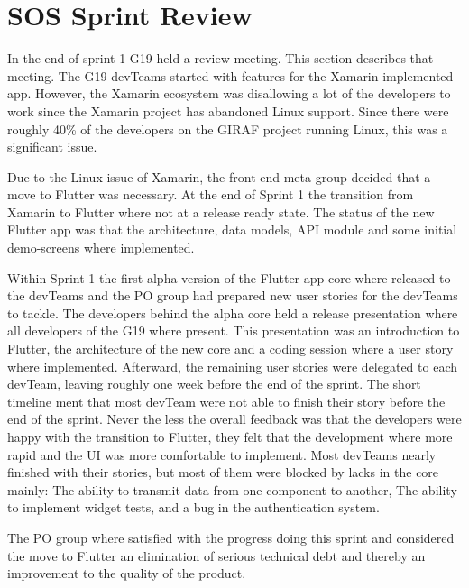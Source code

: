 \section{SOS Sprint Review}
In the end of sprint 1 \gls{G19} held a review meeting. This section describes that meeting.
The \gls{G19} \glspl{devTeam} started with features for the Xamarin implemented app. However, the Xamarin ecosystem was disallowing a lot of the developers to work since the Xamarin project has abandoned Linux support. Since there were roughly 40\% of the developers on the GIRAF project running Linux, this was a significant issue.

Due to the Linux issue of Xamarin, the front-end meta group decided that a move to Flutter was necessary. At the end of Sprint 1 the transition from Xamarin to Flutter where not at a release ready state. The status of the new Flutter app was that the architecture, data models, API module and some initial demo-screens where implemented.

Within Sprint 1 the first alpha version of the Flutter app core where released to the \glspl{devTeam} and the \gls{PO} group had prepared new user stories for the \glspl{devTeam} to tackle. The developers behind the alpha core held a release presentation where all developers of the \gls{G19} where present. This presentation was an introduction to Flutter, the architecture of the new core and a coding session where a user story where implemented. Afterward, the remaining user stories were delegated to each \gls{devTeam}, leaving roughly one week before the end of the sprint. The short timeline ment that most \gls{devTeam} were not  able to finish their story before the end of the sprint. Never the less the overall feedback was that the developers were happy with the transition to Flutter, they felt that the development where more rapid and the UI was more comfortable to implement. Most \glspl{devTeam} nearly finished with their stories, but most of them were blocked by lacks in the core mainly: The ability to transmit data from one component to another, The ability to implement widget tests, and a bug in the authentication system.

The \gls{PO} group where satisfied with the progress doing this sprint and considered the move to Flutter an elimination of serious technical debt and thereby an improvement to the quality of the product.
